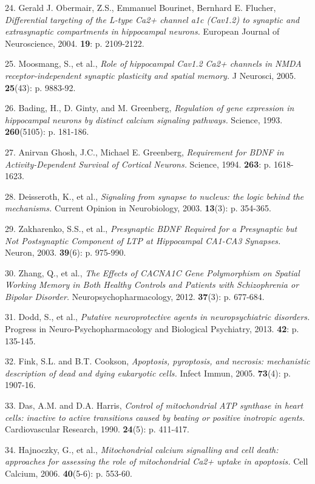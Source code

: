 \documentclass[]{article}
\begin{document}
24. Gerald J. Obermair, Z.S., Emmanuel Bourinet, Bernhard E. Flucher,
\emph{Differential targeting of the L-type Ca2+ channel a1c (Cav1.2) to
synaptic and extrasynaptic compartments in hippocampal neurons.}
European Journal of Neuroscience, 2004. \textbf{19}: p. 2109-2122.

25. Moosmang, S., et al., \emph{Role of hippocampal Cav1.2 Ca2+ channels
in NMDA receptor-independent synaptic plasticity and spatial memory.} J
Neurosci, 2005. \textbf{25}(43): p. 9883-92.

26. Bading, H., D. Ginty, and M. Greenberg, \emph{Regulation of gene
expression in hippocampal neurons by distinct calcium signaling
pathways.} Science, 1993. \textbf{260}(5105): p. 181-186.

27. Anirvan Ghosh, J.C., Michael E. Greenberg, \emph{Requirement for
BDNF in Activity-Dependent Survival of Cortical Neurons.} Science, 1994.
\textbf{263}: p. 1618-1623.

28. Deisseroth, K., et al., \emph{Signaling from synapse to nucleus: the
logic behind the mechanisms.} Current Opinion in Neurobiology, 2003.
\textbf{13}(3): p. 354-365.

29. Zakharenko, S.S., et al., \emph{Presynaptic BDNF Required for a
Presynaptic but Not Postsynaptic Component of LTP at Hippocampal CA1-CA3
Synapses.} Neuron, 2003. \textbf{39}(6): p. 975-990.

30. Zhang, Q., et al., \emph{The Effects of CACNA1C Gene Polymorphism on
Spatial Working Memory in Both Healthy Controls and Patients with
Schizophrenia or Bipolar Disorder.} Neuropsychopharmacology, 2012.
\textbf{37}(3): p. 677-684.

31. Dodd, S., et al., \emph{Putative neuroprotective agents in
neuropsychiatric disorders.} Progress in Neuro-Psychopharmacology and
Biological Psychiatry, 2013. \textbf{42}: p. 135-145.

32. Fink, S.L. and B.T. Cookson, \emph{Apoptosis, pyroptosis, and
necrosis: mechanistic description of dead and dying eukaryotic cells.}
Infect Immun, 2005. \textbf{73}(4): p. 1907-16.

33. Das, A.M. and D.A. Harris, \emph{Control of mitochondrial ATP
synthase in heart cells: inactive to active transitions caused by
beating or positive inotropic agents.} Cardiovascular Research, 1990.
\textbf{24}(5): p. 411-417.

34. Hajnoczky, G., et al., \emph{Mitochondrial calcium signalling and
cell death: approaches for assessing the role of mitochondrial Ca2+
uptake in apoptosis.} Cell Calcium, 2006. \textbf{40}(5-6): p. 553-60.
\end{document}
